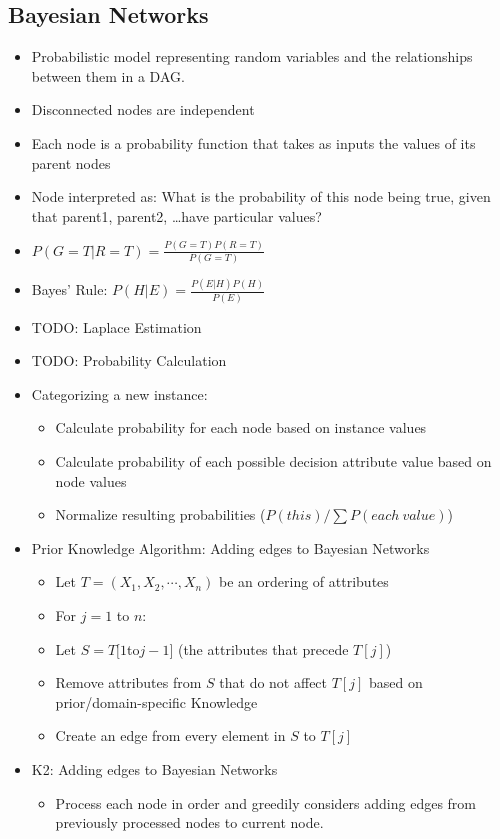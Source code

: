 \documentclass[fontsize=4pt]{scrartcl}
\begin{document}
\begin{multicols}{3}
\subsection{Bayesian Networks}
\begin{itemize}
	\item Probabilistic model representing random variables and the relationships between them in a DAG.
	\item Disconnected nodes are independent
	\item Each node is a probability function that takes as inputs the values of its parent nodes
	\item Node interpreted as: What is the probability of this node being true, given that parent1, parent2, \ldots have particular values?
	\item $P(G = T | R = T) = \frac{P(G = T) P(R = T)}{P(G = T)}$
	\item Bayes' Rule: $P(H | E) = \frac{P(E | H) P(H)}{P(E)}$
	\item TODO: Laplace Estimation
	\item TODO: Probability Calculation
	\item Categorizing a new instance:
		\begin{itemize}
			\item Calculate probability for each node based on instance values
			\item Calculate probability of each possible decision attribute value based on node values
			\item Normalize resulting probabilities ($P(this) / \sum P(each\ value)$)
		\end{itemize}
	\item Prior Knowledge Algorithm: Adding edges to Bayesian Networks
		\begin{itemize}
			\item Let $T = (X_1, X_2, \cdots, X_n)$ be an ordering of attributes
			\item For $j = 1$ to $n$:
			\item Let $S = T[1 $to$ j - 1]$ (the attributes that precede $T[j]$)
			\item Remove attributes from $S$ that do not affect $T[j]$ based on prior/domain-specific Knowledge
			\item Create an edge from every element in $S$ to $T[j]$
		\end{itemize}
	\item K2: Adding edges to Bayesian Networks
		\begin{itemize}
			\item Process each node in order and greedily considers adding edges from previously processed nodes to current node.

\end{itemize}
\end{itemize}
\end{multicols}
\end{document}

